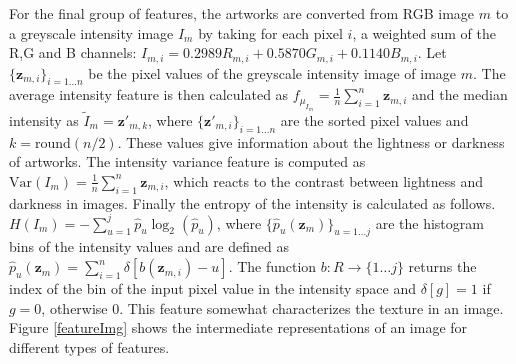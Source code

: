 
For the final group of features, the artworks are converted from RGB image $m$ to a greyscale intensity image $I_m$ by taking for each pixel $i$, a weighted sum of the R,G and B channels: $I_{m,i} = 0.2989R_{m,i} + 0.5870G_{m,i} + 0.1140B_{m,i} $. Let $\{\mathbf{z}_{m,i}\}_{i=1\dots n}$ be the pixel values of the greyscale intensity image of image $m$. The average intensity feature is then calculated as $f_{\mu_{I_m}} = \frac{1}{n} \sum_{i = 1}^{n} \mathbf{z}_{m,i}$ and the median intensity as $\tilde{I}_m = \mathbf{z'}_{m,k}$, where $\{\mathbf{z'}_{m,i}\}_{i = 1\dots n}$ are the sorted pixel values and $k = \mbox{round}(n/2)$. These values give information about the lightness or darkness of artworks. The intensity variance feature is computed as $\mbox{Var}(I_m) = \frac{1}{n} \sum_{i=1}^n \mathbf{z}_{m,i}$, which reacts to the contrast between lightness and darkness in images. Finally the entropy of the intensity is calculated as follows. $H(I_m) = -\sum_{u = 1}^{j} \hat{p}_u \log_2(\hat{p}_u) $, where $\{\hat{p}_u(\mathbf{z}_m)\}_{u = 1 \dots j}$ are the histogram bins of the intensity values and are defined as $\hat{p}_u(\mathbf{z}_m) = \sum_{i=1}^n \delta[b(\mathbf{z}_{m,i}) - u] $. The function $b : R \rightarrow \{1 \dots j \}$ returns the index of the bin of the input pixel value in the intensity space and $\delta[g] = 1$ if $g = 0$, otherwise $0$. This feature somewhat characterizes the texture in an image. Figure \ref{featureImg} shows the intermediate representations of an image for different types of features. 

